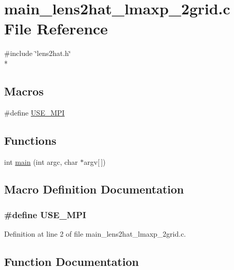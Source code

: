 \section{main\-\_\-lens2hat\-\_\-lmaxp\-\_\-2grid.\-c File Reference}
\label{main__lens2hat__lmaxp__2grid_8c}
{\ttfamily \#include \char`\"{}lens2hat.\-h\char`\"{}}\\*
\subsection*{Macros}
\begin{DoxyCompactItemize}
\item 
\#define \hyperlink{main__lens2hat__lmaxp__2grid_8c_a3869d282031f6ea6b50fdb980b758420}{U\-S\-E\-\_\-\-M\-P\-I}
\end{DoxyCompactItemize}
\subsection*{Functions}
\begin{DoxyCompactItemize}
\item 
int \hyperlink{main__lens2hat__lmaxp__2grid_8c_a0ddf1224851353fc92bfbff6f499fa97}{main} (int argc, char $\ast$argv\mbox{[}$\,$\mbox{]})
\end{DoxyCompactItemize}


\subsection{Macro Definition Documentation}
\subsubsection[{U\-S\-E\-\_\-\-M\-P\-I}]{\setlength{\rightskip}{0pt plus 5cm}\#define U\-S\-E\-\_\-\-M\-P\-I}\label{main__lens2hat__lmaxp__2grid_8c_a3869d282031f6ea6b50fdb980b758420}


Definition at line 2 of file main\-\_\-lens2hat\-\_\-lmaxp\-\_\-2grid.\-c.



\subsection{Function Documentation}
